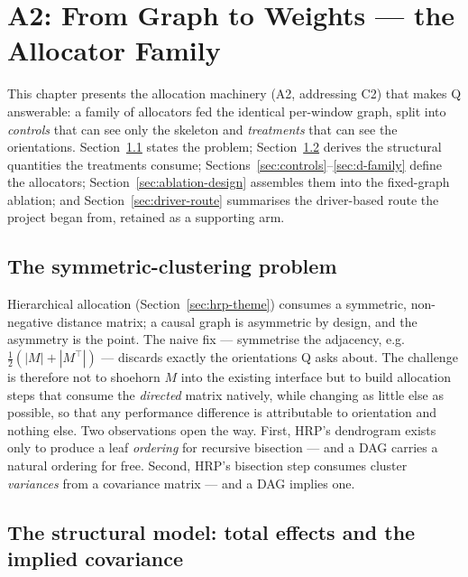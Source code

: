 \chapter{A2: From Graph to Weights --- the Allocator Family}
\label{chap:sensitivity}

This chapter presents the allocation machinery (A2, addressing C2) that makes
Q answerable: a family of allocators fed the identical per-window graph, split
into \emph{controls} that can see only the skeleton and \emph{treatments}
that can see the orientations. Section~\ref{sec:symm} states the problem;
Section~\ref{sec:sem} derives the structural quantities the treatments
consume; Sections~\ref{sec:controls}--\ref{sec:d-family} define the
allocators; Section~\ref{sec:ablation-design} assembles them into the
fixed-graph ablation; and Section~\ref{sec:driver-route} summarises the
driver-based route the project began from, retained as a supporting arm.

\section{The symmetric-clustering problem}
\label{sec:symm}

Hierarchical allocation (Section~\ref{sec:hrp-theme}) consumes a symmetric,
non-negative distance matrix; a causal graph is asymmetric by design, and the
asymmetry is the point. The naive fix --- symmetrise the adjacency, e.g.\
$\tfrac{1}{2}(|M| + |M^\top|)$ --- discards exactly the orientations Q asks
about. The challenge is therefore not to shoehorn $M$ into the existing
interface but to build allocation steps that consume the \emph{directed}
matrix natively, while changing as little else as possible, so that any
performance difference is attributable to orientation and nothing else. Two
observations open the way. First, HRP's dendrogram exists only to produce a
leaf \emph{ordering} for recursive bisection --- and a DAG carries a natural
ordering for free. Second, HRP's bisection step consumes cluster
\emph{variances} from a covariance matrix --- and a DAG implies one.

\section{The structural model: total effects and the implied covariance}
\label{sec:sem}

